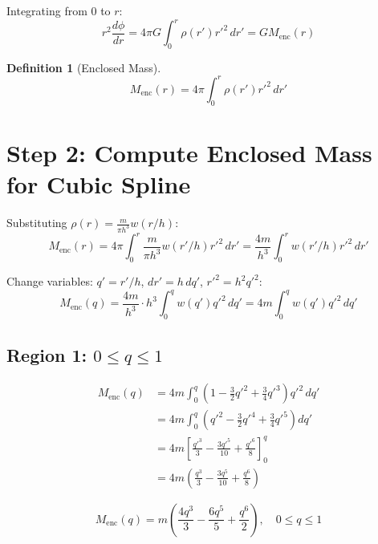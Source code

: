 \documentclass[12pt]{article}
\newtheorem{definition}{Definition}
\begin{document}
Integrating from 0 to $r$:
\begin{equation}
r^2 \frac{d\phi}{dr} = 4\pi G \int_0^r \rho(r') r'^2 \, dr' = G M_{\text{enc}}(r)
\end{equation}

\begin{definition}[Enclosed Mass]
\begin{equation}
\boxed{M_{\text{enc}}(r) = 4\pi \int_0^r \rho(r') r'^2 \, dr'}
\end{equation}
\end{definition}

\section{Step 2: Compute Enclosed Mass for Cubic Spline}

Substituting $\rho(r) = \frac{m}{\pi h^3} w(r/h)$:
\begin{equation}
M_{\text{enc}}(r) = 4\pi \int_0^r \frac{m}{\pi h^3} w(r'/h) r'^2 \, dr' = \frac{4m}{h^3} \int_0^r w(r'/h) r'^2 \, dr'
\end{equation}

Change variables: $q' = r'/h$, $dr' = h \, dq'$, $r'^2 = h^2 q'^2$:
\begin{equation}
M_{\text{enc}}(q) = \frac{4m}{h^3} \cdot h^3 \int_0^q w(q') q'^2 \, dq' = 4m \int_0^q w(q') q'^2 \, dq'
\end{equation}

\subsection{Region 1: $0 \leq q \leq 1$}

\begin{align}
M_{\text{enc}}(q) &= 4m \int_0^q \left(1 - \frac{3}{2}q'^2 + \frac{3}{4}q'^3\right) q'^2 \, dq' \\
&= 4m \int_0^q \left(q'^2 - \frac{3}{2}q'^4 + \frac{3}{4}q'^5\right) dq' \\
&= 4m \left[\frac{q'^3}{3} - \frac{3q'^5}{10} + \frac{q'^6}{8}\right]_0^q \\
&= 4m \left(\frac{q^3}{3} - \frac{3q^5}{10} + \frac{q^6}{8}\right)
\end{align}

\begin{equation}
\boxed{M_{\text{enc}}(q) = m \left(\frac{4q^3}{3} - \frac{6q^5}{5} + \frac{q^6}{2}\right), \quad 0 \leq q \leq 1}
\end{equation}
\end{document}
